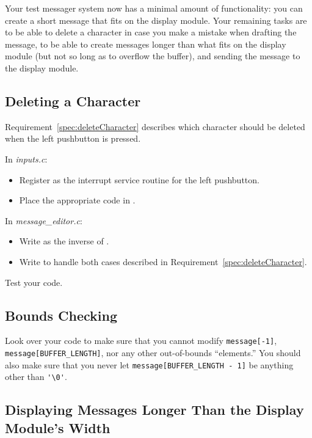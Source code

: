 Your test messager system now has a minimal amount of functionality: you can create a short message that fits on the display module.
Your remaining tasks are to be able to delete a character in case you make a mistake when drafting the message, to be able to create messages longer than what fits on the display module (but not so long as to overflow the buffer), and sending the message to the display module.

\subsection{Deleting a Character}

Requirement~\ref{spec:deleteCharacter} describes which character should be deleted when the left pushbutton is pressed.

In \textit{inputs.c}:
\begin{itemize}
    \item Register  as the interrupt service routine for the left pushbutton.
    \item Place the appropriate code in .
\end{itemize}

In \textit{message\_editor.c}:
\begin{itemize}
    \item Write  as the inverse of .
    \item Write  to handle both cases described in Requirement~\ref{spec:deleteCharacter}.
\end{itemize}

Test your code.

\subsection{Bounds Checking}

Look over your code to make sure that you cannot modify \lstinline{message[-1]}, \lstinline{message[BUFFER_LENGTH]}, nor any other out-of-bounds ``elements.''
You should also make sure that you never let \lstinline{message[BUFFER_LENGTH - 1]} be anything other than \lstinline{'\0'}.

\subsection{Displaying Messages Longer Than the Display Module's Width}


